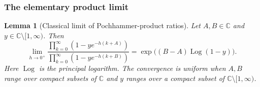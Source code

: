 \documentclass[12pt]{amsart}
\newtheorem{lem}[thm]{Lemma}
\theoremstyle{definition}
\numberwithin{equation}{section}
\theoremstyle{definition}
\def\C{{\mathbb C}}
\def\beq{\begin{equation}}
\def\eeq{\end{equation}}
\begin{document}
\subsubsection{The elementary product limit}

\begin{lem}[Classical limit of Pochhammer-product ratios]
\label{lem:hyp-elementary-products}
Let $A,B\in\C$ and $y\in\C\setminus[1,\infty)$.  Then
\beq\label{eq:hyp-elementary-P-limit}
 \lim_{h\to0^+}
 \frac{\displaystyle\prod_{k=0}^\infty
            (1-ye^{-h(k+A)})}
      {\displaystyle\prod_{k=0}^\infty
            (1-ye^{-h(k+B)})}
 =\exp\bigl((B-A)\operatorname{Log}(1-y)\bigr).
\eeq
Here $\operatorname{Log}$ is the principal logarithm.  The
convergence is uniform when $A,B$ range over compact subsets
of $\C$ and $y$ ranges over a compact subset of
$\C\setminus[1,\infty)$.
\end{lem}
\end{document}
